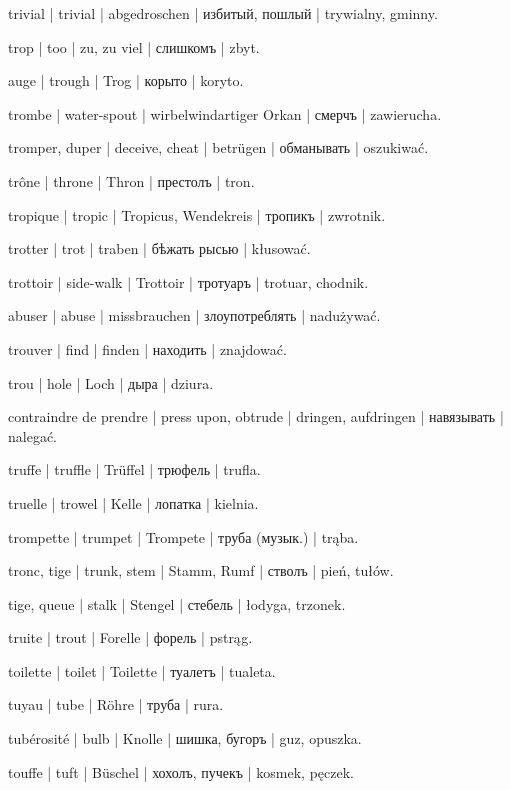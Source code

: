 \begin{outdent}{1em}
trivial | trivial | abgedroschen | избитый, пошлый | trywialny, gminny.

trop | too | zu, zu viel | слишкомъ | zbyt.

auge | trough | Trog | корыто | koryto.

trombe | water-spout | wirbelwindartiger Orkan | смерчъ | zawierucha.

tromper, duper | deceive, cheat | betrügen | обманывать | oszukiwać.

trône | throne | Thron | престолъ | tron.

tropique | tropic | Tropicus, Wendekreis | тропикъ | zwrotnik.

trotter | trot | traben | бѣжать рысью | kłusować.

trottoir | side-walk | Trottoir | тротуаръ | trotuar, chodnik.

abuser | abuse | missbrauchen | злоупотреблять | nadużywać.

trouver | find | finden | находить | znajdować.

trou | hole | Loch | дыра | dziura.

contraindre de prendre | press upon, obtrude | dringen,
aufdringen | навязывать | nalegać.

truffe | truffle | Trüffel | трюфель | trufla.

truelle | trowel | Kelle | лопатка | kielnia.

trompette | trumpet | Trompete | труба (музык.) | trąba.

tronc, tige | trunk, stem | Stamm, Rumf | стволъ | pień, tułów.

\uvsubentry{}
tige, queue | stalk | Stengel | стебель | łodyga, trzonek.

truite | trout | Forelle | форель | pstrąg.

toilette | toilet | Toilette | туалетъ | tualeta.

tuyau | tube | Röhre | труба | rura.

tubérosité | bulb | Knolle | шишка, бугоръ | guz, opuszka.

touffe | tuft | Büschel | хохолъ, пучекъ | kosmek, pęczek.


\end{outdent}
